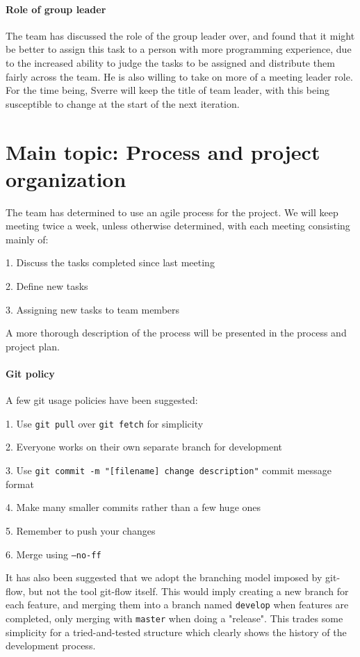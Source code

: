 \documentclass{article}
\begin{document}
\paragraph{Role of group leader}

The team has discussed the role of the group leader over, and found that it might be better to assign this task to a person with more programming experience, due to the increased ability to judge the tasks to be assigned and distribute them fairly across the team. He is also willing to take on more of a meeting leader role. For the time being, Sverre will keep the title of team leader, with this being susceptible to change at the start of the next iteration.

\section{Main topic: Process and project organization}

The team has determined to use an agile process for the project. We will keep meeting twice a week, unless otherwise determined, with each meeting consisting mainly of:

1. Discuss the tasks completed since last meeting

2. Define new tasks

3. Assigning new tasks to team members \newline

\noindent
A more thorough description of the process will be presented in the process and project plan.

\paragraph{Git policy}

A few git usage policies have been suggested:

1. Use \texttt{git pull} over \texttt{git fetch} for simplicity

2. Everyone works on their own separate branch for development

3. Use \texttt{git commit -m "[filename] change description"} commit message format

4. Make many smaller commits rather than a few huge ones

5. Remember to push your changes

6. Merge using \texttt{--no-ff} \newline

\noindent
It has also been suggested that we adopt the branching model imposed by git-flow, but not the tool git-flow itself. This would imply creating a new branch for each feature, and merging them into a branch named \texttt{develop} when features are completed, only merging with \texttt{master} when doing a "release". This trades some simplicity for a tried-and-tested structure which clearly shows the history of the development process.
\end{document}
